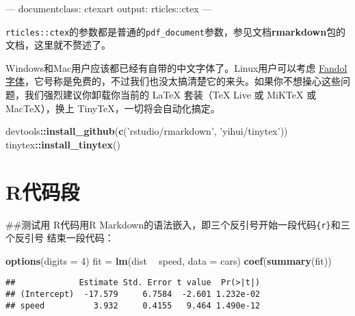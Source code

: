 \documentclass[
]{ctexart}
\newenvironment{Shaded}{\begin{snugshade}}{\end{snugshade}}
\newcommand{\AttributeTok}[1]{\textcolor[rgb]{0.77,0.63,0.00}{#1}}
\newcommand{\DataTypeTok}[1]{\textcolor[rgb]{0.13,0.29,0.53}{#1}}
\newcommand{\DecValTok}[1]{\textcolor[rgb]{0.00,0.00,0.81}{#1}}
\newcommand{\FunctionTok}[1]{\textcolor[rgb]{0.00,0.00,0.00}{#1}}
\newcommand{\KeywordTok}[1]{\textcolor[rgb]{0.13,0.29,0.53}{\textbf{#1}}}
\newcommand{\NormalTok}[1]{#1}
\newcommand{\OperatorTok}[1]{\textcolor[rgb]{0.81,0.36,0.00}{\textbf{#1}}}
\newcommand{\OtherTok}[1]{\textcolor[rgb]{0.56,0.35,0.01}{#1}}
\newcommand{\StringTok}[1]{\textcolor[rgb]{0.31,0.60,0.02}{#1}}
\begin{document}
\begin{Shaded}
\begin{Highlighting}[]
\OtherTok{---}
\FunctionTok{documentclass:}\AttributeTok{ ctexart}
\FunctionTok{output:}\AttributeTok{ rticles::ctex}
\OtherTok{---}
\end{Highlighting}
\end{Shaded}

\texttt{rticles::ctex}的参数都是普通的\texttt{pdf\_document}参数，参见文档\textbf{rmarkdown}包的文档，这里就不赘述了。

Windows和Mac用户应该都已经有自带的中文字体了。Linux用户可以考虑
\href{http://ctan.org/pkg/fandol}{Fandol字体}，它号称是免费的，不过我们也没太搞清楚它的来头。如果你不想操心这些问题，我们强烈建议你卸载你当前的
LaTeX 套装（TeX Live 或 MiKTeX 或 MacTeX），换上
TinyTeX，一切将会自动化搞定。

\begin{Shaded}
\begin{Highlighting}[]
\NormalTok{devtools}\OperatorTok{::}\KeywordTok{install_github}\NormalTok{(}\KeywordTok{c}\NormalTok{(}\StringTok{'rstudio/rmarkdown'}\NormalTok{, }\StringTok{'yihui/tinytex'}\NormalTok{))}
\NormalTok{tinytex}\OperatorTok{::}\KeywordTok{install_tinytex}\NormalTok{()}
\end{Highlighting}
\end{Shaded}

\hypertarget{rux4ee3ux7801ux6bb5}{%
\section{R代码段}\label{rux4ee3ux7801ux6bb5}}

\#\#测试用 R代码用R
Markdown的语法嵌入，即三个反引号开始一段代码\texttt{\textasciigrave{}\textasciigrave{}\textasciigrave{}\{r\}}和三个反引号\texttt{\textasciigrave{}\textasciigrave{}\textasciigrave{}}
结束一段代码：

\begin{Shaded}
\begin{Highlighting}[]
\KeywordTok{options}\NormalTok{(}\DataTypeTok{digits =} \DecValTok{4}\NormalTok{)}
\NormalTok{fit =}\StringTok{ }\KeywordTok{lm}\NormalTok{(dist }\OperatorTok{~}\StringTok{ }\NormalTok{speed, }\DataTypeTok{data =}\NormalTok{ cars)}
\KeywordTok{coef}\NormalTok{(}\KeywordTok{summary}\NormalTok{(fit))}
\end{Highlighting}
\end{Shaded}

\begin{verbatim}
##             Estimate Std. Error t value  Pr(>|t|)
## (Intercept)  -17.579     6.7584  -2.601 1.232e-02
## speed          3.932     0.4155   9.464 1.490e-12
\end{verbatim}
\end{document}
